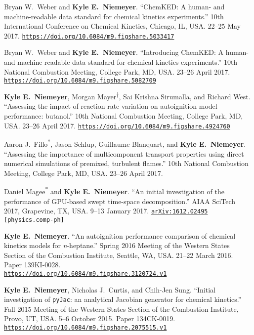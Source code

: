\documentclass[margin,line,11pt]{res}
\makeatletter
\newlength{\bibhang}
\newlength{\bibsep}
 {\@listi \global\bibsep\itemsep \global\advance\bibsep by\parsep}
\newenvironment{bibenum*}
  {\renewcommand\labelenumi{\theenumi.}%
   \etaremune[
     topsep=0pt,
     itemsep=\bibsep,
     parsep=0pt,partopsep=0pt,
     itemindent=-\bibhang,
     leftmargin={\bibhang+\widthof{[999]}}]}
  {\endetaremune}
\newcommand*{\doi}[1]{\href{https://doi.org/#1}{\nolinkurl{https://doi.org/#1}}}
\newcommand*{\grad}[0]{\textsuperscript{*}}
\newcommand*{\ugrad}[0]{\textsuperscript{$\dagger$}}
\makeatother
\begin{document}
\begin{resume}
\begin{bibenum*}
\item Bryan W.~Weber and \textbf{Kyle E.~Niemeyer}.
``ChemKED: A human- and machine-readable data standard for chemical kinetics experiments.''
10th International Conference on Chemical Kinetics, Chicago, IL, USA.
22--25 May 2017.
\doi{10.6084/m9.figshare.5033417}

\item Bryan W.~Weber and \textbf{Kyle E.~Niemeyer}.
``Introducing ChemKED: A human- and machine-readable data standard for chemical kinetics experiments.''
10th National Combustion Meeting, College Park, MD, USA.
23--26 April 2017.
\doi{10.6084/m9.figshare.5082709}

\item \textbf{Kyle E.~Niemeyer}, Morgan Mayer\ugrad{}, Sai Krishna Sirumalla, and Richard West.
``Assessing the impact of reaction rate variation on autoignition model performance: butanol.''
10th National Combustion Meeting, College Park, MD, USA.
23--26 April 2017.
\doi{10.6084/m9.figshare.4924760}

\item Aaron J.~Fillo\grad{}, Jason Schlup, Guillaume Blanquart, and \textbf{Kyle E.~Niemeyer}.
``Assessing the importance of multicomponent transport properties using direct numerical simulations of premixed, turbulent flames.''
10th National Combustion Meeting, College Park, MD, USA.
23--26 April 2017.

\item Daniel Magee\textsuperscript{*} and \textbf{Kyle E.~Niemeyer}.
``An initial investigation of the performance of GPU-based swept time-space decomposition.''
AIAA SciTech 2017, Grapevine, TX, USA.
9--13 January 2017.
{\tt \href{http://arxiv.org/abs/1612.02495}{arXiv:1612.02495} [physics.comp-ph]}

\item \textbf{Kyle E.~Niemeyer}. ``An autoignition performance comparison of chemical kinetics models for \emph{n}-heptane.''
Spring 2016 Meeting of the Western States Section of the Combustion Institute, Seattle, WA, USA.
21--22 March 2016.
Paper 139KI-0028. \\
\doi{10.6084/m9.figshare.3120724.v1}

\item \textbf{Kyle E.~Niemeyer}, Nicholas J.\ Curtis, and Chih-Jen Sung. ``Initial investigation of \texttt{pyJac}: an analytical Jacobian generator for chemical kinetics.''
Fall 2015 Meeting of the Western States Section of the Combustion Institute, Provo, UT, USA.
5--6 October 2015.
Paper 134CK-0019.
\doi{10.6084/m9.figshare.2075515.v1}


\end{bibenum*}
\end{resume}
\end{document}
